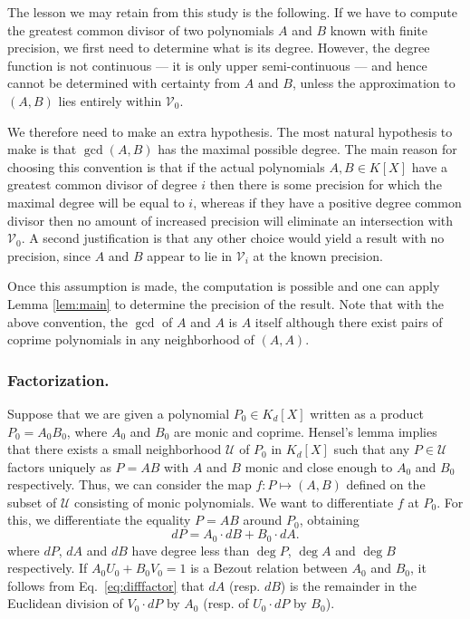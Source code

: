 \documentclass{lms}
\begin{document}
\medskip

The lesson we may retain from this study is the following. If we have to 
compute the greatest common divisor of two polynomials $A$ and $B$ known 
with finite precision, we first need to determine what is its degree. 
However, the degree function is not continuous --- it is only upper 
semi-continuous --- and hence cannot be determined with certainty from $A$ and 
$B$, unless the approximation to $(A,B)$ lies entirely within $\mathcal V_0$.

We therefore need to make an extra hypothesis.  The most natural hypothesis to make
is that $\gcd(A, B)$ has the maximal possible degree.  The main reason for choosing
this convention is that if the actual polynomials $A, B \in K[X]$ have a greatest common
divisor of degree $i$ then there is some precision for which the maximal degree will be
equal to $i$, whereas if they have a positive
degree common divisor then no amount of increased precision will eliminate an intersection
with $\mathcal V_0$.  A second justification is that any other choice would yield a result
with no precision, since $A$ and $B$ appear to lie in $\mathcal V_i$ at the known precision.


Once this assumption is made, the computation is possible and one can apply Lemma 
\ref{lem:main} to determine the precision of the result.
Note that with the above convention, the $\gcd$ of $A$ and $A$ is $A$ 
itself although there exist pairs of coprime polynomials in any 
neighborhood of $(A,A)$.

\subsubsection*{Factorization.}

Suppose that we are given a polynomial $P_0 \in K_d[X]$ written as a 
product $P_0 = A_0 B_0$, where $A_0$ and $B_0$ are monic and coprime. 
Hensel's lemma implies that there exists a small neighborhood $\mathcal 
U$ of $P_0$ in $K_d[X]$ such that any $P \in \mathcal U$ factors 
uniquely as $P = A B$ with $A$ and $B$ monic and close enough to $A_0$ 
and $B_0$ respectively. Thus, we can consider the map $f : P 
\mapsto (A,B)$ defined on the subset of $\mathcal U$ consisting of monic 
polynomials. We want to differentiate $f$ at $P_0$. For this, we 
differentiate the equality $P = A B$ around $P_0$, obtaining
\begin{equation}
\label{eq:difffactor}
dP = A_0 \cdot dB + B_0 \cdot dA.
\end{equation}
where $dP$, $dA$ and $dB$ have degree less than $\deg P$, $\deg A$ and 
$\deg B$ respectively. If $A_0 U_0 + B_0 V_0 = 1$ is a Bezout relation
between $A_0$ and $B_0$, it follows from Eq.~\eqref{eq:difffactor} that
$dA$ (resp. $dB$) is the remainder in the Euclidean division of $V_0
{\cdot} dP$ by $A_0$ (resp. of $U_0 {\cdot} dP$ by $B_0$).
\end{document}
